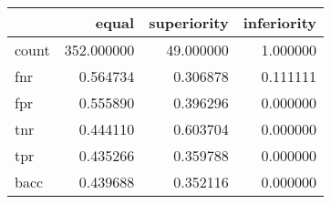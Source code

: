 \begin{tabular}{lrrr}
\toprule
{} &       equal &  superiority &  inferiority \\
\midrule
count &  352.000000 &    49.000000 &     1.000000 \\
fnr   &    0.564734 &     0.306878 &     0.111111 \\
fpr   &    0.555890 &     0.396296 &     0.000000 \\
tnr   &    0.444110 &     0.603704 &     0.000000 \\
tpr   &    0.435266 &     0.359788 &     0.000000 \\
bacc  &    0.439688 &     0.352116 &     0.000000 \\
\bottomrule
\end{tabular}
